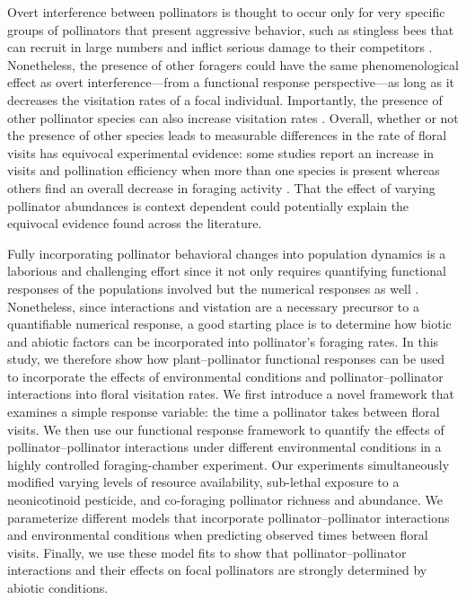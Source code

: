 \begin{refsection}
Overt interference between pollinators is thought to occur only for very specific groups of pollinators that present aggressive behavior, such as stingless bees that can recruit in large numbers and inflict serious damage to their competitors \citep{lichtenberg_olfactory_2011}. Nonetheless, the presence of other foragers could have the same phenomenological effect as overt interference---from a functional response perspective---as long as it decreases the visitation rates of a focal individual. Importantly, the presence of other pollinator species can also increase visitation rates \citep[e.g.][]{greenleaf_wild_2006}. Overall, whether or not the presence of other species leads to measurable differences in the rate of floral visits has equivocal experimental evidence: some studies report an increase in visits and pollination efficiency when more than one species is present \citep{frund_bee_2013} whereas others find an overall decrease in foraging activity \citep{roubik_competitive_1978, thomson_detecting_2006, thomson_importance_2020}. That the effect of varying pollinator abundances is context dependent could potentially explain the equivocal evidence found across the literature.


Fully incorporating pollinator behavioral changes into population dynamics is a laborious and challenging effort since it not only requires quantifying functional responses of the populations involved but the numerical responses as well \citep{revilla2015numerical, abrams_nature_2000}. Nonetheless, since interactions and vistation are a necessary precursor to a quantifiable numerical response, a good starting place is to determine how biotic and abiotic factors can be incorporated into pollinator's foraging rates. In this study, we therefore show how plant--pollinator functional responses can be used to incorporate the effects of environmental conditions and pollinator--pollinator interactions into floral visitation rates. We first introduce a novel framework that examines a simple response variable: the time a pollinator takes between floral visits. We then use our functional response framework to quantify the effects of pollinator--pollinator interactions under different environmental conditions in a highly controlled foraging-chamber experiment. Our experiments simultaneously modified varying levels of resource availability, sub-lethal exposure to a neonicotinoid pesticide, and co-foraging pollinator richness and abundance. We parameterize different models that incorporate pollinator--pollinator interactions and environmental conditions when predicting observed times between floral visits. Finally, we use these model fits to show that pollinator--pollinator interactions and their effects on focal pollinators are strongly determined by abiotic conditions.


\end{refsection}
